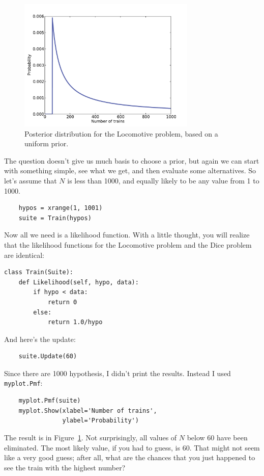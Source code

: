 \documentclass[12pt]{book}
\begin{document}
\begin{figure}
\centerline{\includegraphics[height=2.5in]{figs/train1.pdf}}
\caption{Posterior distribution for the Locomotive problem, based
on a uniform prior.}
\label{fig.train1}
\end{figure}

The question doesn't give us much basis to choose a prior, but
again we can start with something simple, see what we get, and
then evaluate some alternatives.  So let's assume that $N$ is less
than 1000, and equally likely to be any value from 1 to 1000.

\begin{verbatim}
    hypos = xrange(1, 1001)
    suite = Train(hypos)
\end{verbatim}

Now all we need is a likelihood function.  With a little thought,
you will realize that the likelihood functions for the Locomotive
problem and the Dice problem are identical:

\begin{verbatim}
class Train(Suite):
    def Likelihood(self, hypo, data):
        if hypo < data:
            return 0
        else:
            return 1.0/hypo
\end{verbatim}

And here's the update:

\begin{verbatim}
    suite.Update(60)
\end{verbatim}

Since there are 1000 hypothesis, I didn't print the results.
Instead I used {\tt myplot.Pmf}:

\begin{verbatim}
    myplot.Pmf(suite)
    myplot.Show(xlabel='Number of trains',
                ylabel='Probability')
\end{verbatim}

The result is in Figure~\ref{fig.train1}.  Not surprisingly, all
values of $N$ below 60 have been eliminated.  The most likely
value, if you had to guess, is 60.  That might not seem like
a very good guess; after all, what are the chances that you just
happened to see the train with the highest number?
\end{document}
